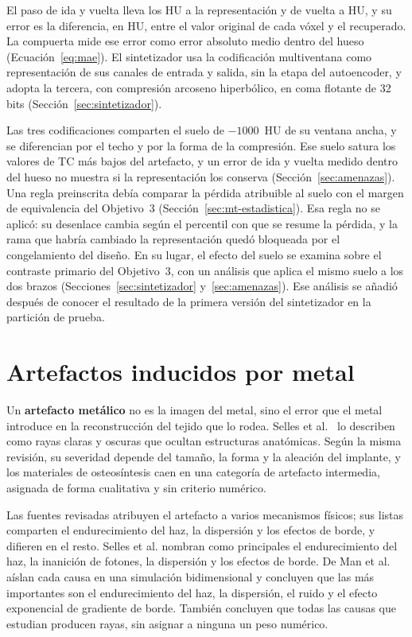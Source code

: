 El paso de ida y vuelta lleva los HU a la representación y de vuelta a HU, y su error es la diferencia, en HU, entre el valor original de cada vóxel y el recuperado. La compuerta mide ese error como error absoluto medio dentro del hueso (Ecuación~\ref{eq:mae}). El sintetizador usa la codificación multiventana como representación de sus canales de entrada y salida, sin la etapa del autoencoder, y adopta la tercera, con compresión arcoseno hiperbólico, en coma flotante de 32 bits (Sección~\ref{sec:sintetizador}).

Las tres codificaciones comparten el suelo de $-1000$~HU de su ventana ancha, y se diferencian por el techo y por la forma de la compresión. Ese suelo satura los valores de TC más bajos del artefacto, y un error de ida y vuelta medido dentro del hueso no muestra si la representación los conserva (Sección~\ref{sec:amenazas}). Una regla preinscrita debía comparar la pérdida atribuible al suelo con el margen de equivalencia del Objetivo~3 (Sección~\ref{sec:mt-estadistica}). Esa regla no se aplicó: su desenlace cambia según el percentil con que se resume la pérdida, y la rama que habría cambiado la representación quedó bloqueada por el congelamiento del diseño. En su lugar, el efecto del suelo se examina sobre el contraste primario del Objetivo~3, con un análisis que aplica el mismo suelo a los dos brazos (Secciones~\ref{sec:sintetizador} y~\ref{sec:amenazas}). Ese análisis se añadió después de conocer el resultado de la primera versión del sintetizador en la partición de prueba.

\section{Artefactos inducidos por metal}\label{sec:mt-artefactos}

Un \textbf{artefacto metálico} no es la imagen del metal, sino el error que el metal introduce en la reconstrucción del tejido que lo rodea. Selles et al.~\cite{selles2024marreview} lo describen como rayas claras y oscuras que ocultan estructuras anatómicas. Según la misma revisión, su severidad depende del tamaño, la forma y la aleación del implante, y los materiales de osteosíntesis caen en una categoría de artefacto intermedia, asignada de forma cualitativa y sin criterio numérico.

Las fuentes revisadas atribuyen el artefacto a varios mecanismos físicos; sus listas comparten el endurecimiento del haz, la dispersión y los efectos de borde, y difieren en el resto. Selles et al. nombran como principales el endurecimiento del haz, la inanición de fotones, la dispersión y los efectos de borde. De Man et al.~\cite{deman1999} aíslan cada causa en una simulación bidimensional y concluyen que las más importantes son el endurecimiento del haz, la dispersión, el ruido y el efecto exponencial de gradiente de borde. También concluyen que todas las causas que estudian producen rayas, sin asignar a ninguna un peso numérico.

